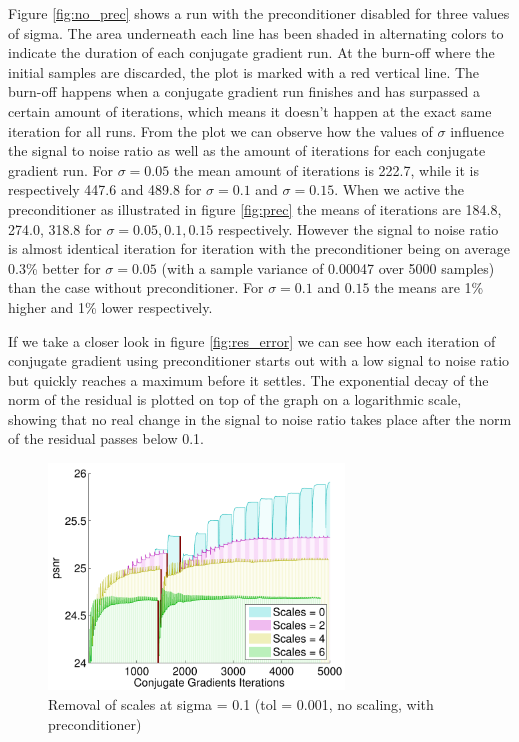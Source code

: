 \documentclass{article}
\begin{document}
Figure \ref{fig:no_prec} shows a run with the preconditioner disabled 
for three values of sigma.  The area underneath each line has been 
shaded in alternating colors to indicate the duration of each conjugate 
gradient run. At the burn-off where the initial samples are discarded, 
the plot is marked with a red vertical line. The burn-off happens when a 
conjugate gradient run finishes and has surpassed a certain amount of 
iterations, which means it doesn't happen at the exact same iteration 
for all runs.  From the plot we can observe how the values of $\sigma$ 
influence the signal to noise ratio as well as the amount of iterations 
for each conjugate gradient run. For $\sigma = 0.05$ the mean amount of 
iterations is 222.7, while it is respectively 447.6 and 489.8 for 
$\sigma = 0.1$ and $\sigma = 0.15$. When we active the preconditioner as 
illustrated in figure
\ref{fig:prec} the means of iterations are 184.8, 274.0, 318.8 for 
$\sigma = 0.05, 0.1, 0.15$ respectively. However the signal to noise 
ratio is almost identical iteration for iteration with the 
preconditioner being on average 0.3\% better for $\sigma = 0.05$ (with a 
sample variance of 0.00047 over 5000 samples) than the case without 
preconditioner. For $\sigma = 0.1$ and $0.15$ the means are 1\% higher 
and 1\% lower respectively.

If we take a closer look in figure \ref{fig:res_error} we can see how 
each iteration of conjugate gradient using preconditioner starts out 
with a low signal to noise ratio but quickly reaches a maximum before it 
settles.  The exponential decay of the norm of the residual is plotted 
on top of the graph on a logarithmic scale, showing that no real change 
in the signal to noise ratio takes place after the norm of the residual 
passes below 0.1.


\begin{figure}[h]
		\centering
		\includegraphics[width=0.7\textwidth]{img/rem_scales_overview}
		\caption{Removal of scales at sigma = 0.1 (tol = 0.001, no 
scaling, with preconditioner)}
		\label{fig:rem_scales}
\end{figure}%
\end{document}
